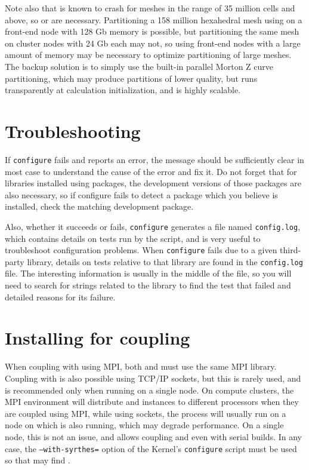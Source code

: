 \documentclass[a4paper,10pt,twoside]{article}
\begin{document}
Note also that  is known to crash for meshes in the range of
35 million cells and above, so  or \scotch are necessary.
Partitioning a 158 million hexahedral mesh using 
on a front-end node with 128 Gb memory is possible,
but partitioning the same mesh on cluster nodes with 24 Gb each
may not, so using front-end nodes with a large amount of memory may be
necessary to optimize partitioning of large meshes.
The backup solution is to simply use the built-in parallel Morton Z curve
partitioning, which may produce partitions of lower quality, but
runs transparently at \CS calculation initialization, and is highly
scalable.


\section{Troubleshooting\label{sec:config:troubleshoot}}

If \texttt{configure} fails and reports an error, the message should
be sufficiently clear in most case to understand the cause of the
error and fix it. Do not forget that for libraries installed using
packages, the development versions of those packages are also
necessary, so if configure fails to detect a package which you
believe is installed, check the matching development package.

Also, whether it succeeds or fails, \texttt{configure} generates
a file named \texttt{config.log}, which contains details on tests
run by the script, and is very useful to troubleshoot
configuration problems. When \texttt{configure} fails due to a given
third-party library, details on tests relative to that library
are found in the \texttt{config.log} file. The interesting information
is usually in the middle of the file, so you will need to search
for strings related to the library to find the test that failed
and detailed reasons for its failure.

\section{Installing for \syrthes coupling\label{sec:syrthes}}

When coupling with \syrthes using MPI, both \CS and \syrthes must
use the same MPI library. Coupling with \syrthes is also possible
using TCP/IP sockets, but this is rarely used, and is recommended only
when running on a single node. On compute clusters, the MPI environment
will distribute \syrthes and \CS instances to different processors when
they are coupled using MPI, while using sockets, the \syrthes process will
usually run on a node on which \CS is also running, which may degrade
performance. On a single node, this is not an issue, and allows coupling
\CS and \syrthes even with serial builds.
In any case, the \texttt{--with-syrthes=} option of the
Kernel's \texttt{configure} script must be used so that
\CS may find \syrthes.
\end{document}
